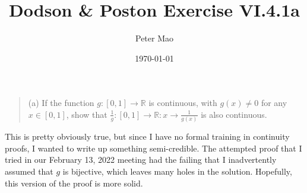 \documentclass[11pt]{article}
\title{Dodson \& Poston Exercise VI.4.1a}
\author{Peter Mao}
\date{\today}
\begin{document}
\maketitle

\begin{quote}
(a) If the function $g:[0,1] \rightarrow \mathbb{R}$ is continuous,
  with $g(x) \neq 0$ for any $x \in [0,1]$, show that $\frac{1}{g} :
  [0,1] \rightarrow \mathbb{R} : x \rightarrow \frac{1}{g(x)}$ is also
  continuous.
\end{quote}

This is pretty obviously true, but since I have no formal training in
continuity proofs, I wanted to write up something semi-credible.  The
attempted proof that I tried in our February 13, 2022 meeting had the
failing that I inadvertently assumed that $g$ is bijective, which
leaves many holes in the solution.  Hopefully, this version of the
proof is more solid.
\end{document}
